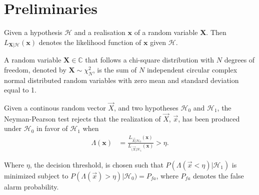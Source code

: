\documentclass[a4paper, openany, oneside]{memoir}
\begin{document}
\section{Preliminaries}

\begin{blockDefinition}
Given a hypothesis $\mathcal{H}$ and a realisation $\mathbf{x}$ of a random variable $\mathbf{X}$. Then $L_{\mathbf{X} | \mathcal{H}}(\mathbf{x})$ denotes the likelihood function of $\mathbf{x}$ given $\mathcal{H}$.
\end{blockDefinition}




\begin{blockDefinition}
A random variable $\mathbf{X} \in \mathbb{C}$ that follows a chi-square distribution with $N$ degrees of freedom, denoted by $\mathbf{X} \sim \chi^2_N$, is the sum of $N$ independent circular complex normal distributed random variables with zero mean and standard deviation equal to 1. 
\end{blockDefinition}

\begin{blockDefinition}
Given a continous random vector $\vec{X}$, and two hypotheses $\mathcal{H}_0$ and $\mathcal{H}_1$, the Neyman-Pearson test rejects that the realization of $\vec{X}$, $\vec{x}$, has been produced under $\mathcal{H}_0$ in favor of $\mathcal{H}_1$
when
\begin{align*}
    \Lambda (\mathbf{x}) &= \frac{L_{\vec{X} | \mathcal{H}_0} (\mathbf{x})}{L_{(\vec{X} | \mathcal{H}_1}(\mathbf{x})} > \eta. 
\end{align*}

Where $\eta$, the decision threshold, is chosen such that $P(\Lambda(\vec{x} < \eta) | \mathcal{H}_1)$ is minimized subject to $P(\Lambda(\vec{x}) > \eta) | \mathcal{H}_0) = P_{fa}$, where $P_{fa}$ denotes the false alarm probability. %
\end{blockDefinition}
\end{document}
